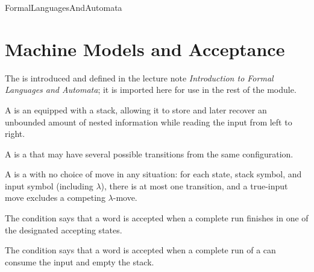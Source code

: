 \documentclass[hidelinks]{article}
\begin{document}
\begin{smodule}[title={Formal Languages and Automata}]{FormalLanguagesAndAutomata}
    \section{Machine Models and Acceptance}

    The  is introduced and defined in the lecture note \emph{Introduction to Formal Languages and Automata}; it is imported here for use in the rest of the module.

    \begin{sdefinition}[for=pushdown automaton]
        A  is an  equipped with a stack, allowing it to store and later recover an unbounded amount of nested information while reading the input from left to right.
    \end{sdefinition}

    \begin{sdefinition}[for=nondeterministic pushdown automaton]
        A  is a  that may have several possible transitions from the same configuration.
    \end{sdefinition}

    \begin{sdefinition}[for=deterministic pushdown automaton]
        A  is a  with no choice of move in any situation: for each state, stack symbol, and input symbol (including $\lambda$), there is at most one transition, and a true-input move excludes a competing $\lambda$-move.
    \end{sdefinition}

    \begin{sdefinition}[for=final-state acceptance]
        The  condition says that a word is accepted when a complete run finishes in one of the designated accepting states.
    \end{sdefinition}

    \begin{sdefinition}[for=empty-stack acceptance]
        The  condition says that a word is accepted when a complete run of a  can consume the input and empty the stack.
    \end{sdefinition}


\end{smodule}
\end{document}
